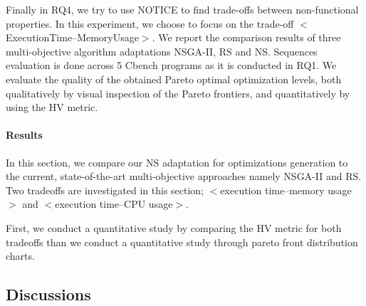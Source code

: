 Finally in RQ4, we try to use NOTICE to find trade-offs between non-functional properties. In this experiment, we choose to focus on the trade-off $<$ExecutionTime--MemoryUsage$>$. We report the comparison results of three multi-objective algorithm adaptations NSGA-II, RS and NS. 
Sequences evaluation is done across 5 Cbench programs as it is conducted in RQ1.
We evaluate the quality of the obtained Pareto optimal optimization levels, both qualitatively by visual inspection of the Pareto frontiers, and quantitatively by using the HV metric.
\paragraph{Results}
In this section, we compare our NS adaptation for optimizations generation to the current, state-of-the-art multi-objective approaches namely NSGA-II and RS. Two tradeoffs are investigated in this section; $<$execution time--memory usage$>$ and $<$execution time--CPU usage$>$.

First, we conduct a quantitative study by comparing the HV metric for both tradeoffs than we conduct a quantitative study through pareto front distribution charts.
\subsection{Discussions}
 
 
 
